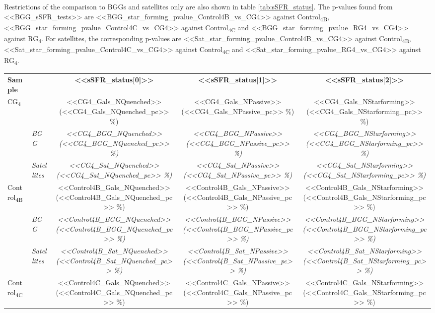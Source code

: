 \documentclass{aa}
\newcommand{\CB}{Control\textsubscript{4B}}
\newcommand{\CC}{Control\textsubscript{4C}}
\newcommand{\CG}{CG\textsubscript{4}}
\newcommand{\RG}{RG\textsubscript{4}}
\begin{document}
 Restrictions of the comparison to BGGs and satellites only are also shown in table \ref{tab:sSFR_status}. 
The p-values found from <<BGG_sSFR_tests>> are 
  <<BGG_star_forming_pvalue_Control4B_vs_CG4>> against \CB,
  <<BGG_star_forming_pvalue_Control4C_vs_CG4>> against \CC{} and 
  <<BGG_star_forming_pvalue_RG4_vs_CG4>>  against \RG. 
For satellites, the corresponding p-values are
  <<Sat_star_forming_pvalue_Control4B_vs_CG4>> against \CB,
  <<Sat_star_forming_pvalue_Control4C_vs_CG4>> against \CC{} and
  <<Sat_star_forming_pvalue_RG4_vs_CG4>> against \RG.

\begin{table}
    \centering
    \begin{tabular}{llccc}
        \toprule
            \textbf{Sample} & & \textbf{  <<sSFR_status[0]>>  } & \textbf{  <<sSFR_status[1]>>  } & \textbf{  <<sSFR_status[2]>>  } \\
            \CG & &  <<CG4_Gals_NQuenched>>  (<<CG4_Gals_NQuenched_pc>> \%) &  <<CG4_Gals_NPassive>>  (<<CG4_Gals_NPassive_pc>> \%)&  <<CG4_Gals_NStarforming>>  (<<CG4_Gals_NStarforming_pc>> \%) \\
             & \emph{BGG} &  \emph{<<CG4_BGG_NQuenched>>  (<<CG4_BGG_NQuenched_pc>> \%)} &  \emph{<<CG4_BGG_NPassive>>  (<<CG4_BGG_NPassive_pc>> \%)} &  \emph{<<CG4_BGG_NStarforming>>  (<<CG4_BGG_NStarforming_pc>> \%)} \\
             & \emph{Satellites} &  \emph{<<CG4_Sat_NQuenched>>  (<<CG4_Sat_NQuenched_pc>> \%)} &  \emph{<<CG4_Sat_NPassive>>  (<<CG4_Sat_NPassive_pc>> \%)} &  \emph{<<CG4_Sat_NStarforming>>  (<<CG4_Sat_NStarforming_pc>> \%)} \\
            \CB & &  <<Control4B_Gals_NQuenched>>  (<<Control4B_Gals_NQuenched_pc>> \%) &  <<Control4B_Gals_NPassive>>  (<<Control4B_Gals_NPassive_pc>> \%) &  <<Control4B_Gals_NStarforming>>  (<<Control4B_Gals_NStarforming_pc>> \%) \\
             & \emph{BGG} &  \emph{<<Control4B_BGG_NQuenched>>  (<<Control4B_BGG_NQuenched_pc>> \%)} &  \emph{<<Control4B_BGG_NPassive>>  (<<Control4B_BGG_NPassive_pc>> \%)} &  \emph{<<Control4B_BGG_NStarforming>>  (<<Control4B_BGG_NStarforming_pc>> \%)} \\
             & \emph{Satellites} &  \emph{<<Control4B_Sat_NQuenched>>  (<<Control4B_Sat_NQuenched_pc>> \%)} &  \emph{<<Control4B_Sat_NPassive>>  (<<Control4B_Sat_NPassive_pc>> \%)} &  \emph{<<Control4B_Sat_NStarforming>>  (<<Control4B_Sat_NStarforming_pc>> \%)} \\
            \CC & &  <<Control4C_Gals_NQuenched>>  (<<Control4C_Gals_NQuenched_pc>> \%) &  <<Control4C_Gals_NPassive>>  (<<Control4C_Gals_NPassive_pc>> \%) &  <<Control4C_Gals_NStarforming>>  (<<Control4C_Gals_NStarforming_pc>> \%) \\

\end{tabular}
\end{table}
\end{document}
